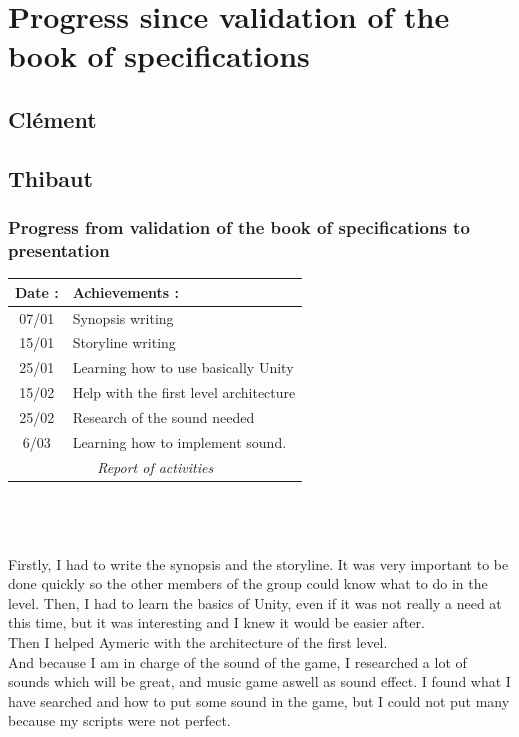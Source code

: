 \chapter{Progress since validation of the book of specifications}

	\section{Cl\'ement}

	\section{Thibaut}
		\subsection{Progress from validation of the book of specifications to  presentation}
			\begin{tabular}{|c|l|}
				\hline \cellcolor{gray}Date :	& \cellcolor{gray}Achievements :\\
				\hline 07/01& Synopsis writing\\
				\hline 15/01& Storyline writing\\
				\hline 25/01& Learning how to use basically Unity\\
				\hline 15/02& Help with the first level architecture\\
				\hline 25/02& Research of the sound needed\\
				\hline 6/03& Learning how to implement sound.\\
				\hline \multicolumn{2}{c}{\textit{Report of activities}}
			\end{tabular}
			\\\\\\
			Firstly, I had to write the synopsis and the storyline.
			It was very important to be done quickly so the other members of the group could know what to do in the level.
			Then, I had to learn the basics of Unity, even if it was not really a need at this time, but it was interesting
			and I knew it would be easier after.
			\\
			Then I helped Aymeric with the architecture of the first level.
			\\
			And because I am in charge of the sound of the game, I researched a lot of sounds which will be great,
			and music game aswell as sound effect. I found what I have searched and how to put some sound in the game,
			but I could not put many because my scripts were not perfect.

